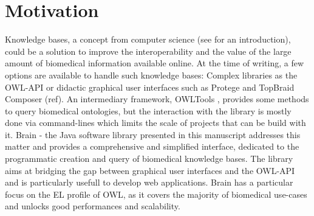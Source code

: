 \documentclass{bioinfo}
\begin{document}
\section{Motivation}
Knowledge bases, a concept from computer science (see \citealp{Krotzsch2012} for an introduction),
could be a solution to improve the interoperability and the value of the large amount of biomedical information available online.
At the time of writing, a few options are available to handle such knowledge bases: Complex
libraries as the OWL-API \citep{MatthewHorridge2011} or didactic graphical user interfaces such as
Protege \citep{StanfordCenterforBiomedicalInformaticsResearch} and TopBraid Composer (ref). An intermediary framework,
OWLTools \citep{MungallC},
provides some methods to query biomedical ontologies, but the interaction with the library is mostly done via command-lines which
limits the scale of projects that can be build with it.
Brain - the Java software library presented in this manuscript addresses this matter and provides a comprehensive and simplified
interface, dedicated to the programmatic creation and query of biomedical knowledge bases. The library aims at bridging the gap between
graphical user interfaces and the OWL-API and is particularly usefull to develop web applications.
Brain has a particular focus on the EL profile of OWL, as it covers the majority of biomedical
use-cases and unlocks good performances and scalability. 
\end{document}
